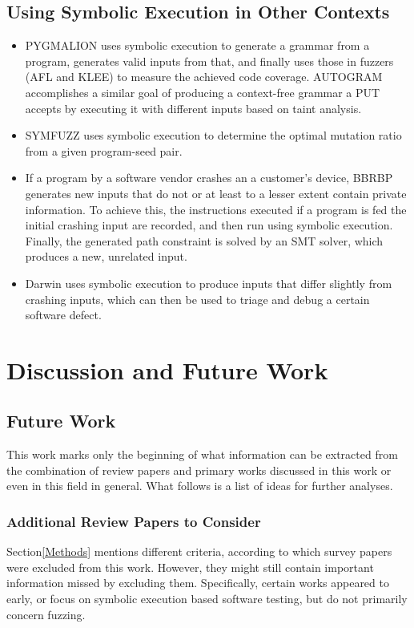 \documentclass{article}
\begin{document}
\begin{multicols}{2}
  \subsection{Using Symbolic Execution in Other Contexts}
  \begin{itemize}
    \item PYGMALION\cite{PYGMALION} uses symbolic execution to generate a grammar from a program, generates valid inputs from that, and finally uses those in fuzzers (AFL\cite{AFLPlusPlus} and KLEE\cite{KLEE}) to measure the achieved code coverage. AUTOGRAM\cite{AUTOGRAM} accomplishes a similar goal of producing a context-free grammar a PUT accepts by executing it with different inputs based on taint analysis.
    \item SYMFUZZ\cite{SYMFUZZ} uses symbolic execution to determine the optimal mutation ratio from a given program-seed pair.
    \item If a program by a software vendor crashes an a customer's device, BBRBP\cite{BBRBP} generates new inputs that do not or at least to a lesser extent contain private information. To achieve this, the instructions executed if a program is fed the initial crashing input are recorded, and then run using symbolic execution. Finally, the generated path constraint is solved by an SMT solver, which produces a new, unrelated input.
    \item Darwin\cite{Darwin} uses symbolic execution to produce inputs that differ slightly from crashing inputs, which can then be used to triage and debug a certain software defect.
  \end{itemize}

  \section{Discussion and Future Work}
  \label{Discussion}
  \subsection{Future Work}
  This work marks only the beginning of what information can be extracted from the combination of review papers and primary works discussed in this work or even in this field in general. What follows is a list of ideas for further analyses.

  \subsubsection{Additional Review Papers to Consider}
  Section\ref{Methods} mentions different criteria, according to which survey papers were excluded from this work. However, they might still contain important information missed by excluding them. Specifically, certain works appeared to early\cite{AutomaticTestDataGeneration, BruteForceVulnDiscovery,BreakingSoftware}, or focus on symbolic execution based software testing, but do not primarily concern fuzzing\cite{DSETestGeneration, SurveySymbex, SearchStrategies, NewTrendsSymbex, ReviewConcolicTesting}.


\end{multicols}
\end{document}
